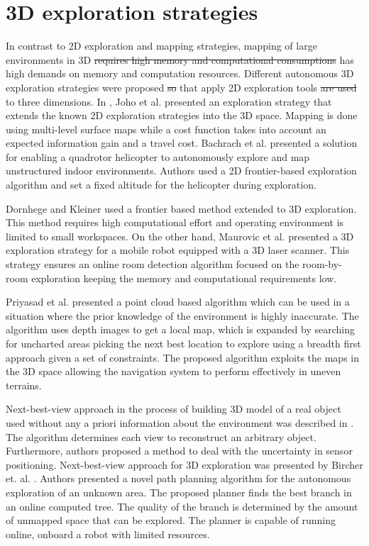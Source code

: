 \section{3D exploration strategies}

In contrast to 2D exploration and mapping strategies, mapping of large environments in 3D \st{requires high memory and computational consumptions} {\color{red}has high demands on memory and computation resources}. 
Different autonomous 3D exploration strategies were proposed \st{so} that {\color{red}apply} 2D exploration tools \st{are used}  to three dimensions. In \cite{Joho2007}, Joho et al. presented an exploration strategy that extends the known 2D exploration strategies into the 3D space. Mapping is done using multi-level surface maps while a cost function takes
into account an expected information gain and a travel cost. 
Bachrach et al. \cite{Bachrach2009} presented a solution for enabling a quadrotor helicopter to autonomously explore and map unstructured indoor environments. Authors used a 2D frontier-based exploration algorithm and set a fixed altitude for the helicopter during exploration.  

Dornhege and Kleiner \cite{Dornhege2013} used a frontier based method extended to 3D exploration. This method requires high computational effort and operating environment is limited to small workspaces. On the other hand, Maurovic et al. \cite{Maurovic2014} presented a 3D exploration strategy for a mobile robot equipped with a 3D laser scanner. This strategy ensures an online room detection algorithm focused on the room-by-room exploration keeping the memory and computational requirements low.

Priyasad et al. \cite{Priyasad2018} presented a point cloud based algorithm which can be used in a situation where the prior knowledge of the environment is highly inaccurate. The algorithm uses depth images to get a local map, which is expanded by searching for uncharted areas picking the next best location to explore using a breadth first approach given a set of constraints. The proposed algorithm exploits the maps in the 3D space allowing the navigation system to perform effectively in uneven terrains. 

Next-best-view approach in the process of building 3D model of a real object used without any a priori information about the environment was described in \cite{VasquezGomez2014}. The algorithm determines each view to reconstruct an arbitrary object. Furthermore, authors proposed a method to deal with the uncertainty in sensor positioning.
Next-best-view approach for 3D exploration was presented by Bircher et. al. \cite{Bircher2016}. Authors presented a novel path planning algorithm for the autonomous exploration of an unknown area. The proposed planner finds the best branch in an online computed tree. The quality of the branch is determined by the amount of unmapped space that can be explored. The planner is capable of running online, onboard a robot with limited resources.


